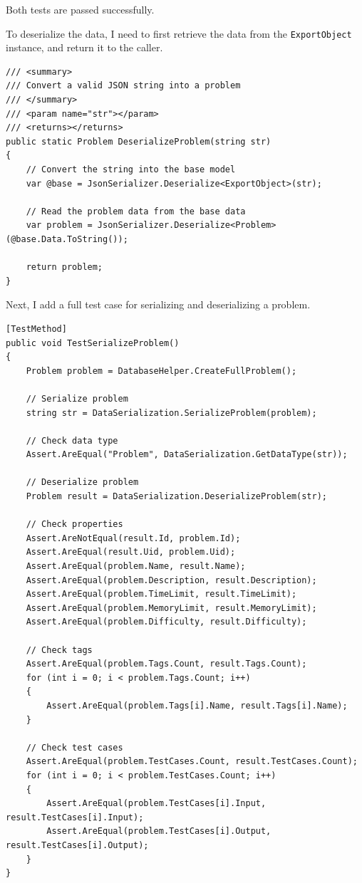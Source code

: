 \documentclass[a4paper]{report}
\newcommand{\code}{\texttt}
\begin{document}
Both tests are passed successfully.

To deserialize the data, I need to first retrieve the data from the \code{ExportObject} instance, and return it to the caller.

\begin{verbatim}
/// <summary>
/// Convert a valid JSON string into a problem
/// </summary>
/// <param name="str"></param>
/// <returns></returns>
public static Problem DeserializeProblem(string str)
{
    // Convert the string into the base model
    var @base = JsonSerializer.Deserialize<ExportObject>(str);

    // Read the problem data from the base data
    var problem = JsonSerializer.Deserialize<Problem>(@base.Data.ToString());

    return problem;
}
\end{verbatim}

Next, I add a full test case for serializing and deserializing a problem.

\begin{verbatim}
[TestMethod]
public void TestSerializeProblem()
{
    Problem problem = DatabaseHelper.CreateFullProblem();
    
    // Serialize problem
    string str = DataSerialization.SerializeProblem(problem);

    // Check data type
    Assert.AreEqual("Problem", DataSerialization.GetDataType(str));

    // Deserialize problem
    Problem result = DataSerialization.DeserializeProblem(str);
    
    // Check properties
    Assert.AreNotEqual(result.Id, problem.Id);
    Assert.AreEqual(result.Uid, problem.Uid);
    Assert.AreEqual(problem.Name, result.Name);
    Assert.AreEqual(problem.Description, result.Description);
    Assert.AreEqual(problem.TimeLimit, result.TimeLimit);
    Assert.AreEqual(problem.MemoryLimit, result.MemoryLimit);
    Assert.AreEqual(problem.Difficulty, result.Difficulty);
    
    // Check tags
    Assert.AreEqual(problem.Tags.Count, result.Tags.Count);
    for (int i = 0; i < problem.Tags.Count; i++)
    {
        Assert.AreEqual(problem.Tags[i].Name, result.Tags[i].Name);
    }
    
    // Check test cases
    Assert.AreEqual(problem.TestCases.Count, result.TestCases.Count);
    for (int i = 0; i < problem.TestCases.Count; i++)
    {
        Assert.AreEqual(problem.TestCases[i].Input, result.TestCases[i].Input);
        Assert.AreEqual(problem.TestCases[i].Output, result.TestCases[i].Output);
    }
}
\end{verbatim}
\end{document}
